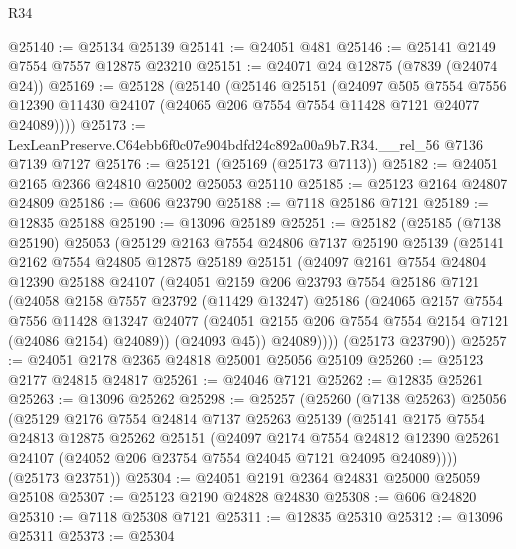 \begin{lexlean}{R34}
\begin{coremodule}
@25140 := @25134 @25139
@25141 := @24051 @481
@25146 := @25141 @2149 @7554 @7557 @12875 @23210
@25151 := @24071 @24 @12875 (@7839 (@24074 @24))
@25169 := @25128
    (@25140
      (@25146
        @25151
        (@24097
          @505
          @7554
          @7556
          @12390
          @11430
          @24107
          (@24065 @206 @7554 @7554 @11428 @7121 @24077 @24089))))
@25173 := LexLeanPreserve.C64ebb6f0c07e904bdfd24c892a00a9b7.R34.__rel_56 @7136 @7139 @7127
@25176 := @25121 (@25169 (@25173 @7113))
@25182 := @24051 @2165 @2366 @24810 @25002 @25053 @25110
@25185 := @25123 @2164 @24807 @24809
@25186 := @606 @23790
@25188 := @7118 @25186 @7121
@25189 := @12835 @25188
@25190 := @13096 @25189
@25251 := @25182
    (@25185
      (@7138 @25190)
      @25053
      (@25129
        @2163
        @7554
        @24806
        @7137
        @25190
        @25139
        (@25141
          @2162
          @7554
          @24805
          @12875
          @25189
          @25151
          (@24097
            @2161
            @7554
            @24804
            @12390
            @25188
            @24107
            (@24051
              @2159
              @206
              @23793
              @7554
              @25186
              @7121
              (@24058
                @2158
                @7557
                @23792
                (@11429 @13247)
                @25186
                (@24065
                  @2157
                  @7554
                  @7556
                  @11428
                  @13247
                  @24077
                  (@24051 @2155 @206 @7554 @7554 @2154 @7121 (@24086 @2154) @24089))
                (@24093 @45))
              @24089))))
      (@25173 @23790))
@25257 := @24051 @2178 @2365 @24818 @25001 @25056 @25109
@25260 := @25123 @2177 @24815 @24817
@25261 := @24046 @7121
@25262 := @12835 @25261
@25263 := @13096 @25262
@25298 := @25257
    (@25260
      (@7138 @25263)
      @25056
      (@25129
        @2176
        @7554
        @24814
        @7137
        @25263
        @25139
        (@25141
          @2175
          @7554
          @24813
          @12875
          @25262
          @25151
          (@24097
            @2174
            @7554
            @24812
            @12390
            @25261
            @24107
            (@24052 @206 @23754 @7554 @24045 @7121 @24095 @24089))))
      (@25173 @23751))
@25304 := @24051 @2191 @2364 @24831 @25000 @25059 @25108
@25307 := @25123 @2190 @24828 @24830
@25308 := @606 @24820
@25310 := @7118 @25308 @7121
@25311 := @12835 @25310
@25312 := @13096 @25311
@25373 := @25304

\end{coremodule}
\end{lexlean}
